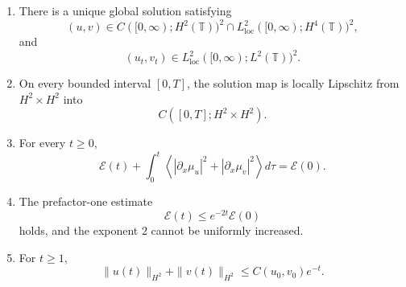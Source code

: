 \documentclass[10pt,a4paper]{article}
\theoremstyle{definition}
\begin{document}
\begin{enumerate}
  \item There is a unique global solution satisfying
  \begin{equation}
    (u,v)\in
    C([0,\infty);H^2(\mathbb T))^2
    \cap
    L^2_{\mathrm{loc}}([0,\infty);H^4(\mathbb T))^2,
  \end{equation}
  and
  \begin{equation}
    (u_t,v_t)\in
    L^2_{\mathrm{loc}}([0,\infty);L^2(\mathbb T))^2.
  \end{equation}

  \item On every bounded interval $[0,T]$, the solution map is locally
  Lipschitz from $H^2\times H^2$ into
  \begin{equation}
    C([0,T];H^2\times H^2).
  \end{equation}

  \item For every $t\geq 0$,
  \begin{equation}
    \mathcal E(t)
    +
    \int_0^t
    \left\langle
      |\partial_x\mu_u|^2+|\partial_x\mu_v|^2
    \right\rangle d\tau
    =
    \mathcal E(0).
  \end{equation}

  \item The prefactor-one estimate
  \begin{equation}
    \mathcal E(t)\leq e^{-2t}\mathcal E(0)
  \end{equation}
  holds, and the exponent $2$ cannot be uniformly increased.

  \item For $t\geq 1$,
  \begin{equation}
    \|u(t)\|_{H^2}+\|v(t)\|_{H^2}
    \leq C(u_0,v_0)e^{-t}.
  \end{equation}
\end{enumerate}
\end{document}
